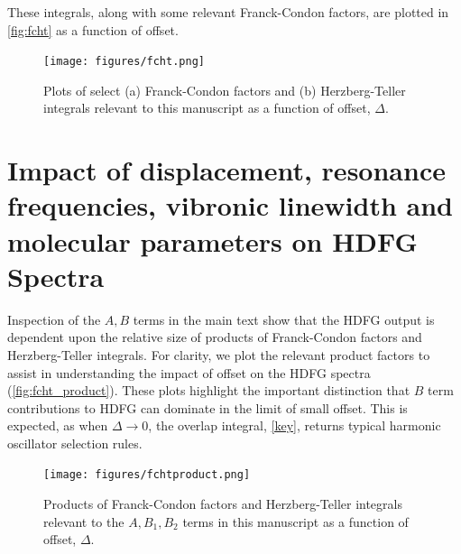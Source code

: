 \documentclass[aip, jcp, reprint, onecolumn, nofootinbib]{revtex4-2}
\begin{document}
These integrals, along with some relevant Franck-Condon factors, are plotted in \autoref{fig:fcht} as a function of offset. 

\begin{figure}[!htbp]
	\centering
	\texttt{[image: figures/fcht.png]}
	\caption{Plots of select (a) Franck-Condon factors and (b) Herzberg-Teller integrals relevant to this manuscript as a function of offset, $\Delta$.} 
	\label{fig:fcht}
\end{figure}


\newpage
\section{Impact of displacement, resonance frequencies, vibronic linewidth and molecular parameters on HDFG Spectra}
Inspection of the $A,B$ terms in the main text show that the HDFG output is dependent upon the relative size of products of Franck-Condon factors and Herzberg-Teller integrals.
For clarity, we plot the relevant product factors to assist in understanding the impact of offset on the HDFG spectra (\autoref{fig:fcht_product}).
These plots highlight the important distinction that $B$ term contributions to HDFG can dominate in the limit of small offset.
This is expected, as when $\Delta \rightarrow 0$, the overlap integral, \autoref{key}, returns typical harmonic oscillator selection rules.

\begin{figure}[!htbp]
	\centering
	\texttt{[image: figures/fchtproduct.png]}
	\caption{Products of Franck-Condon factors and Herzberg-Teller integrals relevant to the $A, B_1, B_2$ terms in this manuscript as a function of offset, $\Delta$.} 
	\label{fig:fcht_product}
\end{figure}
\end{document}
